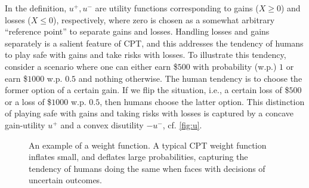In the definition, $u^+, u^-$ are utility functions corresponding to gains ($X \ge 0$) and losses ($X \le 0$), respectively,
where zero is chosen as a somewhat arbitrary ``reference point'' to separate gains and losses.
Handling losses and gains separately is a salient feature of CPT, and this addresses the tendency of humans to play safe with gains and take risks with losses. %
To illustrate this tendency, 
consider a scenario where one can either earn \$$500$ with probability (w.p.) $1$ or earn \$$1000$ w.p. $0.5$ and nothing otherwise. 
The human tendency is to choose the former option of a certain gain. 
If we flip the situation, i.e., a certain loss of \$$500$ or a loss of \$$1000$ w.p. $0.5$, 
then humans choose the latter option.  
This distinction of playing safe with gains and taking risks with losses is captured by a concave gain-utility
$u^+$ and a convex disutility $-u^-$, cf. \cref{fig:u}.

\begin{figure}[h]
\centering
{}
\caption{An example of a weight function.
A typical CPT weight function inflates small, and deflates large probabilities, capturing the 
tendency of humans doing the same when faces with decisions of uncertain outcomes.
}
\label{fig:w}
\end{figure}

